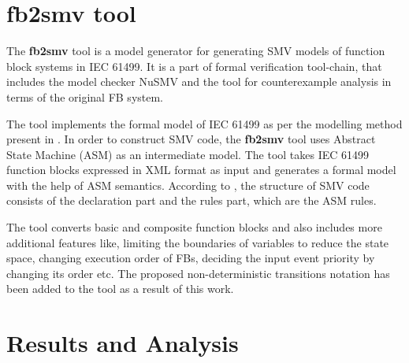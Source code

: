 \begin{bibunit}
\begin{lstlisting}[breaklines,basicstyle=\small]
\end{lstlisting}

\section {{fb2smv} tool}
The {\bf fb2smv} tool \cite{fb2smv} is a model generator for generating SMV models of function block systems in IEC 61499. It is a part of formal verification tool-chain, that includes the model checker NuSMV and the tool for counterexample analysis in terms of the original FB system. 

The tool implements the formal model of IEC 61499 as per the modelling method present in  \cite{drozdov2021formal}. In order to construct {SMV} code, the {\bf fb2smv} tool uses Abstract State Machine (ASM) \cite{gurevich1995evolving} as an intermediate model. The tool takes  IEC 61499 function blocks expressed in XML format as input and generates a formal model with the help of ASM semantics. According to \cite{drozdov2021formal}, the structure of {SMV} code consists of  the declaration part and the rules part, which are the ASM rules.


The tool converts basic and composite function blocks and also includes more additional features like, limiting the boundaries of variables to reduce the state space, changing execution order of FBs, deciding the input event priority by changing its order etc. The proposed non-deterministic transitions notation has been added to the tool as a result of this work. 



\section{Results and Analysis}


\end{bibunit}
